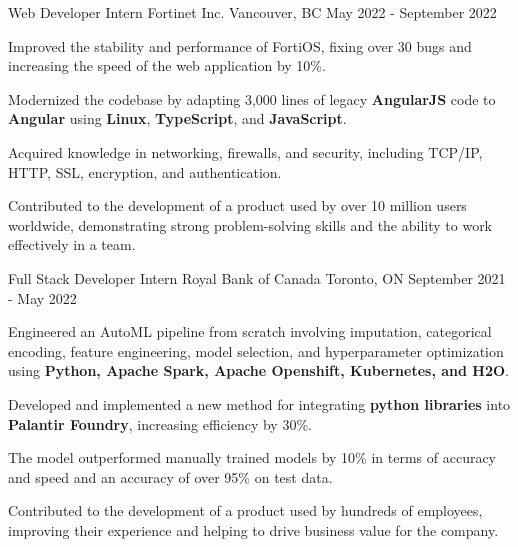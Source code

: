 

\begin{cventries}

	\cventry
	{Web Developer Intern } %
	{Fortinet Inc. } %
	{Vancouver, BC } %
	{May 2022 - September 2022} %
	{
		\begin{cvitems} %
			\item {Improved the stability and performance of FortiOS, fixing over 30 bugs and increasing the speed of the web application by 10\%.}
			\item {Modernized the codebase by adapting 3,000 lines of legacy \textbf{AngularJS} code to \textbf{Angular} using \textbf{Linux}, \textbf{TypeScript}, and \textbf{JavaScript}.}
			\item {Acquired knowledge in networking, firewalls, and security, including TCP/IP, HTTP, SSL, encryption, and authentication.}
			\item {Contributed to the development of a product used by over 10 million users worldwide, demonstrating strong problem-solving skills and the ability to work effectively in a team.}
		\end{cvitems}
	}

	\cventry
	{Full Stack Developer Intern } %
	{Royal Bank of Canada } %
	{Toronto, ON } %
	{September 2021 - May 2022} %
	{
		\begin{cvitems} %
			\item {Engineered an AutoML pipeline from scratch involving imputation, categorical encoding, feature engineering, model selection, and hyperparameter optimization using \textbf{Python, Apache Spark, Apache Openshift, Kubernetes, and H2O}.} 
      \item {Developed and implemented a new method for integrating \textbf{python libraries} into \textbf{Palantir Foundry}, increasing efficiency by 30\%.}
      \item {The model outperformed manually trained models by 10\% in terms of accuracy and speed and an accuracy of over 95\% on test data.}
      \item {Contributed to the development of a product used by hundreds of employees, improving their experience and helping to drive business value for the company.}
		\end{cvitems}
	}


\end{cventries}
